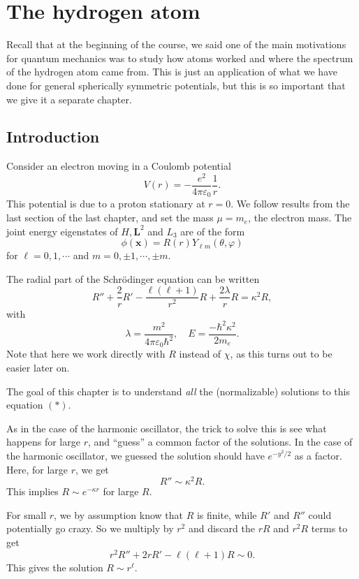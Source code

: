 \documentclass[a4paper]{article}
\begin{document}
\section{The hydrogen atom}
Recall that at the beginning of the course, we said one of the main motivations for quantum mechanics was to study how atoms worked and where the spectrum of the hydrogen atom came from. This is just an application of what we have done for general spherically symmetric potentials, but this is so important that we give it a separate chapter.

\subsection{Introduction}
Consider an electron moving in a Coulomb potential
\[
  V(r) = -\frac{e^2}{4\pi \varepsilon_0} \frac{1}{r}.
\]
This potential is due to a proton stationary at $r = 0$. We follow results from the last section of the last chapter, and set the mass $\mu = m_e$, the electron mass. The joint energy eigenstates of $H, \mathbf{L}^2$ and $L_3$ are of the form
\[
  \phi(\mathbf{x}) = R(r) Y_{\ell m} (\theta, \varphi)
\]
for $\ell = 0, 1, \cdots$ and $m = 0, \pm 1, \cdots, \pm m$.

The radial part of the Schr\"odinger equation can be written
\[
  R'' + \frac{2}{r} R' - \frac{\ell(\ell + 1)}{r^2}R + \frac{2 \lambda}{r} R = \kappa^2 R,\tag{$*$}
\]
with
\[
  \lambda = \frac{m^2}{4\pi \varepsilon_0 \hbar^2},\quad E = \frac{-\hbar^2 \kappa^2}{2 m_e}.
\]
Note that here we work directly with $R$ instead of $\chi$, as this turns out to be easier later on.

The goal of this chapter is to understand \emph{all} the (normalizable) solutions to this equation $(*)$.

As in the case of the harmonic oscillator, the trick to solve this is see what happens for large $r$, and ``guess'' a common factor of the solutions. In the case of the harmonic oscillator, we guessed the solution should have $e^{-y^2/2}$ as a factor. Here, for large $r$, we get
\[
  R'' \sim \kappa^2 R.
\]
This implies $R \sim e^{-\kappa r}$ for large $R$.

For small $r$, we by assumption know that $R$ is finite, while $R'$ and $R''$ could potentially go crazy. So we multiply by $r^2$ and discard the $rR$ and $r^2R$ terms to get
\[
  r^2 R'' + 2r R' - \ell(\ell + 1) R \sim 0.
\]
This gives the solution $R \sim r^\ell$.
\end{document}
